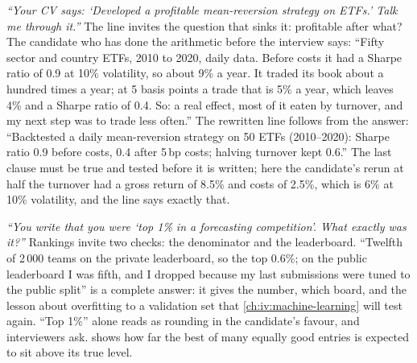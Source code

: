 \begin{example}\label{ex:iv:applications:project}
\emph{``Your CV says: `Developed a profitable mean-reversion strategy on ETFs.' Talk me through it.''} The line invites the
question that sinks it: profitable after what? The candidate who has done the arithmetic before the interview says:
``Fifty sector and country ETFs, 2010 to 2020, daily data. Before costs it had a Sharpe ratio of 0.9 at 10\% volatility,
so about 9\% a year. It traded its book about a hundred times a year; at 5 basis points a trade that is 5\% a year, which
leaves 4\% and a Sharpe ratio of 0.4. So: a real effect, most of it eaten by turnover, and my next step was to trade less
often.'' The rewritten line follows from the answer: ``Backtested a daily mean-reversion strategy on 50 ETFs
(2010--2020): Sharpe ratio 0.9 before costs, 0.4 after 5\,bp costs; halving turnover kept 0.6.'' The last clause must be
true and tested before it is written; here the candidate's rerun at half the turnover had a gross return of 8.5\% and costs
of 2.5\%, which is 6\% at 10\% volatility, and the line says exactly that.
\end{example}

\begin{example}\label{ex:iv:applications:ranking}
\emph{``You write that you were `top 1\% in a forecasting competition'. What exactly was it?''} Rankings invite two
checks: the denominator and the leaderboard. ``Twelfth of 2\,000 teams on the private leaderboard, so the top 0.6\%; on
the public leaderboard I was fifth, and I dropped because my last submissions were tuned to the public split'' is a
complete answer: it gives the number, which board, and the lesson about overfitting to a validation set that
\cref{ch:iv:machine-learning} will test again. ``Top 1\%'' alone reads as rounding in the candidate's favour, and
interviewers ask.  shows how far the best of many equally good entries is expected
to sit above its true level.
\end{example}


